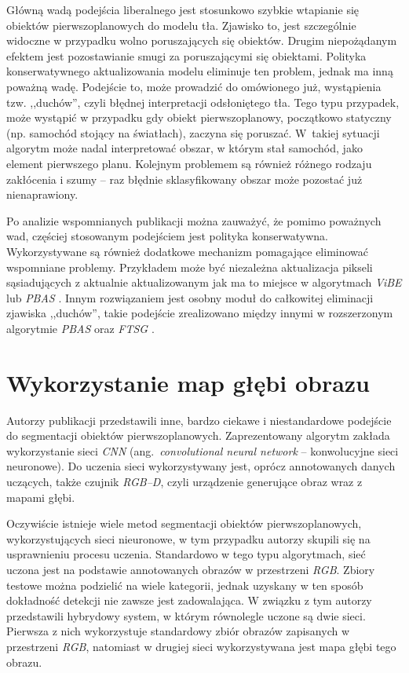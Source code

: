 Główną wadą podejścia liberalnego jest stosunkowo szybkie wtapianie się obiektów pierwszoplanowych do modelu tła. 
Zjawisko to, jest szczególnie widoczne w przypadku wolno poruszających się obiektów. Drugim niepożądanym efektem jest pozostawianie smugi za poruszającymi się obiektami.
Polityka konserwatywnego aktualizowania modelu eliminuje ten problem, jednak ma inną poważną wadę. 
Podejście to, może prowadzić do omówionego już, wystąpienia tzw. ,,duchów'', czyli błędnej interpretacji odsłoniętego tła. 
Tego typu przypadek, może wystąpić w przypadku gdy obiekt pierwszoplanowy, początkowo statyczny (np. samochód stojący na światłach), zaczyna się poruszać. 
W~takiej sytuacji algorytm może nadal interpretować obszar, w którym stał samochód, jako element pierwszego planu. 
Kolejnym problemem są również różnego rodzaju zakłócenia i szumy -- raz błędnie sklasyfikowany obszar może pozostać już nienaprawiony.

Po analizie wspomnianych publikacji można zauważyć, że pomimo poważnych wad, częściej stosowanym podejściem jest polityka konserwatywna. Wykorzystywane są również dodatkowe mechanizm pomagające eliminować wspomniane problemy. 
Przykładem może być niezależna aktualizacja pikseli sąsiadujących z aktualnie aktualizowanym jak ma to miejsce w algorytmach \textit{ViBE} \cite{kryjak_13_vibe} lub \textit{PBAS} \cite{kryjak_13_pbas}. 
Innym rozwiązaniem jest osobny moduł do całkowitej eliminacji zjawiska ,,duchów'', takie podejście zrealizowano między innymi w rozszerzonym algorytmie \textit{PBAS} \cite{kryjak_14_pbas} oraz \textit{FTSG} \cite{wang_14}.

\section{Wykorzystanie map głębi obrazu}
\label{sec:rgbd}

Autorzy publikacji \cite{hoffman_16_rbgd} przedstawili inne, bardzo ciekawe i niestandardowe podejście do segmentacji obiektów pierwszoplanowych. 
Zaprezentowany algorytm zakłada wykorzystanie sieci \textit{CNN} (ang.~\textit{convolutional neural network} -- konwolucyjne sieci neuronowe). 
Do uczenia sieci wykorzystywany jest, oprócz annotowanych danych uczących, także czujnik \textit{RGB--D}, czyli urządzenie generujące obraz wraz z mapami głębi. 

Oczywiście istnieje wiele metod segmentacji obiektów pierwszoplanowych, wykorzystujących sieci nieuronowe, w tym przypadku autorzy skupili się na usprawnieniu procesu uczenia. 
Standardowo w tego typu algorytmach, sieć uczona jest na podstawie annotowanych obrazów w przestrzeni \textit{RGB}. 
Zbiory testowe można podzielić na wiele kategorii, jednak uzyskany w ten sposób dokładność detekcji nie zawsze jest zadowalająca. 
W związku z tym autorzy przedstawili hybrydowy system, w którym równolegle uczone są dwie sieci. 
Pierwsza z nich wykorzystuje standardowy zbiór obrazów zapisanych w przestrzeni \textit{RGB}, natomiast w drugiej sieci wykorzystywana jest mapa głębi tego obrazu.

